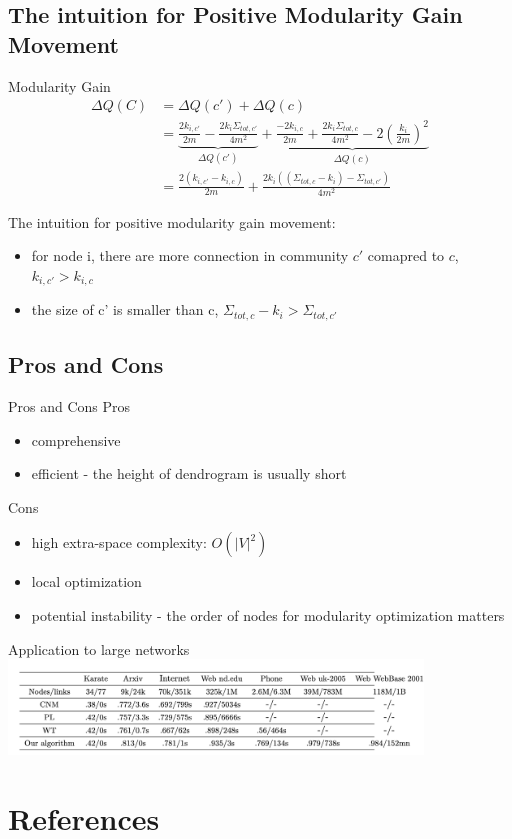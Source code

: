 \documentclass[12pt]{beamer}
\begin{document}
\subsection{The intuition for Positive Modularity Gain Movement}
\begin{frame}{Modularity Gain}
\begin{align*}
\Delta Q(C)
    &= \Delta Q(c') + \Delta Q(c) \\
    &= \underbrace{\frac{2k_{i, c'}}{2m} - \frac{2k_i\Sigma_{tot, c'}}{4m^2}}_{\Delta Q(c')}
        + \underbrace{\frac{-2k_{i, c}}{2m} + \frac{2k_i\Sigma_{tot, c}}{4m^2} - 2(\frac{k_i}{2m})^2}_{\Delta Q(c)} \\
    &= \frac{2(k_{i, c'}-k_{i, c})}{2m} + \frac{2k_i((\Sigma_{tot, c} - k_i) - \Sigma_{tot, c'})}{4m^2}
\end{align*}

The intuition for positive modularity gain movement:
\begin{itemize}
    \item for node i, there are more connection in community $c'$ comapred to $c$, $k_{i, c'} > k_{i, c}$
    \item the size of c' is smaller than c, $\Sigma_{tot, c} - k_i > \Sigma_{tot, c'}$
\end{itemize}
\end{frame}


\subsection{Pros and Cons}
\begin{frame}{Pros and Cons}
Pros
\begin{itemize}
    \item comprehensive
    \item efficient - the height of dendrogram is usually short
\end{itemize}
Cons
\begin{itemize}
    \item high extra-space complexity: $O(|V|^2)$
    \item local optimization
    \item potential instability - the order of nodes for modularity optimization matters
\end{itemize}
\end{frame}


\begin{frame}{Application to large networks}
\centering
\includegraphics[width=11cm]{img/img6.png}
\end{frame}


\section{References}


\begin{frame}[allowframebreaks]{}
\renewcommand{\section}[2]{}%

\end{frame}
\end{document}
